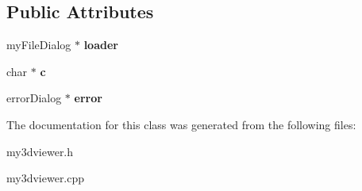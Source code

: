\subsection*{Public Attributes}
\begin{DoxyCompactItemize}
\item 
\hypertarget{class_my3_d_viewer_a6ffc1811f936c098ec47f5078c9dd1ac}{my\-File\-Dialog $\ast$ {\bfseries loader}}\label{class_my3_d_viewer_a6ffc1811f936c098ec47f5078c9dd1ac}

\item 
\hypertarget{class_my3_d_viewer_ad6467d43b11c35d4ba5793cfced2fe3b}{char $\ast$ {\bfseries c}}\label{class_my3_d_viewer_ad6467d43b11c35d4ba5793cfced2fe3b}

\item 
\hypertarget{class_my3_d_viewer_aa89c467cd9032bfe9fc9b1e023367a41}{error\-Dialog $\ast$ {\bfseries error}}\label{class_my3_d_viewer_aa89c467cd9032bfe9fc9b1e023367a41}

\end{DoxyCompactItemize}


The documentation for this class was generated from the following files\-:\begin{DoxyCompactItemize}
\item 
my3dviewer.\-h\item 
my3dviewer.\-cpp\end{DoxyCompactItemize}
